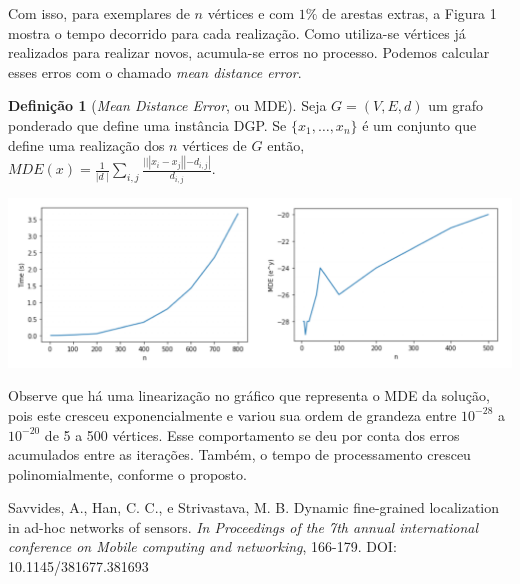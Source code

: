\documentclass[a0,portrait]{a0poster}
\theoremstyle{plain}
\theoremstyle{definition}
\newtheorem{definicao}{Definição}[]
\begin{document}
\begin{multicols}{2}
\noindent Com isso, para exemplares de $n$ vértices e com $1\%$ de arestas extras, a Figura 1 mostra o tempo decorrido para cada realização. Como utiliza-se vértices já realizados para realizar novos, acumula-se erros no processo. Podemos calcular esses erros com o chamado \textit{mean distance error}.

\begin{definicao}[\textit{Mean Distance Error}, ou MDE]
	Seja $G= (V,E,d)$ um grafo ponderado que define uma instância DGP. Se $\{x_1, \dots, x_n\}$ é um conjunto que define uma realização dos $n$ vértices de $G$ então,
	$MDE(x) = \frac{1}{|d\;|} \sum_{i,j}^{}\frac{|||x_i - x_j|| - d_{i,j}|}{d_{i,j}} .$
\end{definicao}

\vspace{0.5cm}
\begin{minipage}[b]{1.0\linewidth}\label{fig:resultados}
	\begin{center}
		\includegraphics[width=37cm]{resu.png}
	\end{center}
\end{minipage}
\vspace{-1cm}

\noindent Observe que há uma linearização no gráfico que representa o MDE da solução, pois este cresceu exponencialmente e variou sua ordem de grandeza entre $10^{-28}$ a $10^{-20}$ de 5 a 500 vértices. Esse comportamento se deu por conta dos erros acumulados entre as iterações. Também, o tempo de processamento cresceu polinomialmente, conforme o proposto.

\vspace{-1cm}
\begin{thebibliography}{00}
	\vspace{-0.7cm}
	 Savvides, A., Han, C. C., e Strivastava, M. B. Dynamic fine-grained localization in ad-hoc networks of sensors.\textit{ In Proceedings of the 7th annual international conference on Mobile computing and networking}, 166-179. DOI: 10.1145/381677.381693
	

\end{thebibliography}
\end{multicols}
\end{document}
